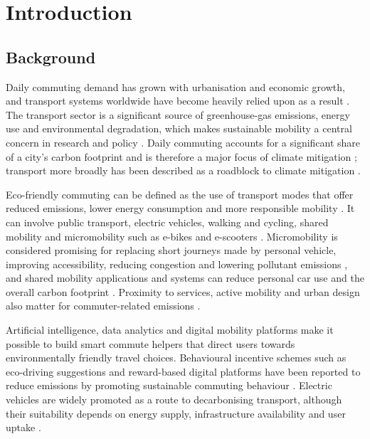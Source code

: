 \documentclass[11pt,a4paper]{article}
\begin{document}
\begin{abstract}
\vspace{0.5em}
\noindent\textbf{Keywords:} Eco-friendly commuting; sustainable urban mobility; multimodal transport;
micromobility; Mobility-as-a-Service; behavioural nudging; artificial intelligence; smart commute
assistant; simulated data; carbon emissions.
\end{abstract}

\newpage
\tableofcontents
\newpage

\section{Introduction}

\subsection{Background}
Daily commuting demand has grown with urbanisation and economic growth, and transport systems
worldwide have become heavily relied upon as a result \citep{lattman2024}. The transport sector is a
significant source of greenhouse-gas emissions, energy use and environmental degradation, which makes
sustainable mobility a central concern in research and policy \citep{collazos2024,ndhlovu2025}.
Daily commuting accounts for a significant share of a city's carbon footprint and is therefore a
major focus of climate mitigation \citep{eslami2025}; transport more broadly has been described as a
roadblock to climate mitigation \citep{creutzig2015}.

Eco-friendly commuting can be defined as the use of transport modes that offer reduced emissions,
lower energy consumption and more responsible mobility \citep{lattman2024}. It can involve public
transport, electric vehicles, walking and cycling, shared mobility and micromobility such as e-bikes
and e-scooters \citep{comi2024,ndhlovu2025}. Micromobility is considered promising for replacing
short journeys made by personal vehicle, improving accessibility, reducing congestion and lowering
pollutant emissions \citep{comi2024}, and shared mobility applications and systems can reduce
personal car use and the overall carbon footprint \citep{garus2024}. Proximity to services, active
mobility and urban design also matter for commuter-related emissions \citep{marzolla2025}.

Artificial intelligence, data analytics and digital mobility platforms make it possible to build smart
commute helpers that direct users towards environmentally friendly travel choices. Behavioural
incentive schemes such as eco-driving suggestions and reward-based digital platforms have been
reported to reduce emissions by promoting sustainable commuting behaviour \citep{niazi2024}.
Electric vehicles are widely promoted as a route to decarbonising transport, although their
suitability depends on energy supply, infrastructure availability and user uptake \citep{ndhlovu2025}.
\end{document}
